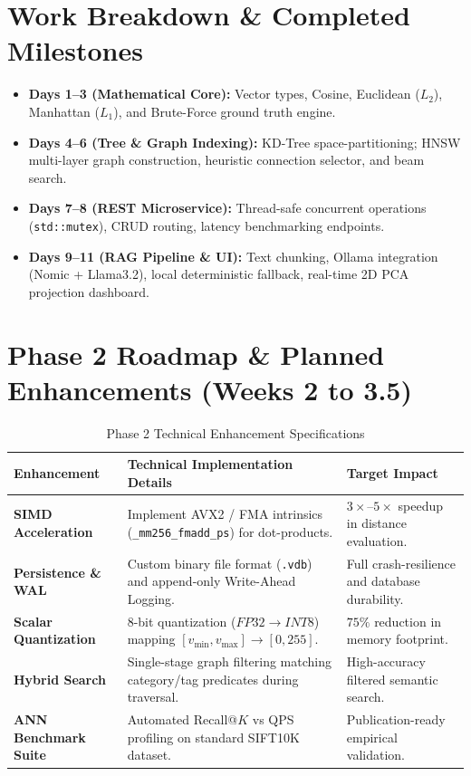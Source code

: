 \documentclass[11pt,a4paper]{article}
\begin{document}
\section{Work Breakdown \& Completed Milestones}
\begin{itemize}[noitemsep,topsep=2pt]
    \item \textbf{Days 1--3 (Mathematical Core):} Vector types, Cosine, Euclidean ($L_2$), Manhattan ($L_1$), and Brute-Force ground truth engine.
    \item \textbf{Days 4--6 (Tree \& Graph Indexing):} KD-Tree space-partitioning; HNSW multi-layer graph construction, heuristic connection selector, and beam search.
    \item \textbf{Days 7--8 (REST Microservice):} Thread-safe concurrent operations (\texttt{std::mutex}), CRUD routing, latency benchmarking endpoints.
    \item \textbf{Days 9--11 (RAG Pipeline \& UI):} Text chunking, Ollama integration (Nomic + Llama3.2), local deterministic fallback, real-time 2D PCA projection dashboard.
\end{itemize}

\section{Phase 2 Roadmap \& Planned Enhancements (Weeks 2 to 3.5)}
\begin{table}[H]
\centering
\small
\caption{Phase 2 Technical Enhancement Specifications}
\label{tab:enhancements}
\begin{tabular}{p{3.5cm}p{7.5cm}p{3cm}}
\toprule
\textbf{Enhancement} & \textbf{Technical Implementation Details} & \textbf{Target Impact} \\
\midrule
\textbf{SIMD Acceleration} & Implement AVX2 / FMA intrinsics (\texttt{\_mm256\_fmadd\_ps}) for dot-products. & $3\times\text{--}5\times$ speedup in distance evaluation. \\
\textbf{Persistence \& WAL} & Custom binary file format (\texttt{.vdb}) and append-only Write-Ahead Logging. & Full crash-resilience and database durability. \\
\textbf{Scalar Quantization} & 8-bit quantization ($FP32 \to INT8$) mapping $[v_{\min}, v_{\max}] \to [0, 255]$. & $75\%$ reduction in memory footprint. \\
\textbf{Hybrid Search} & Single-stage graph filtering matching category/tag predicates during traversal. & High-accuracy filtered semantic search. \\
\textbf{ANN Benchmark Suite} & Automated Recall@$K$ vs QPS profiling on standard SIFT10K dataset. & Publication-ready empirical validation. \\
\bottomrule
\end{tabular}
\end{table}
\end{document}
